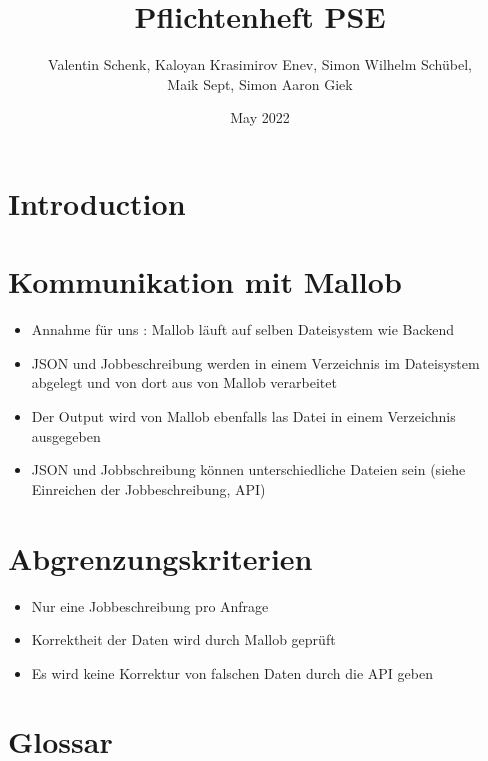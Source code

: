 


\title{Pflichtenheft PSE}
\author{Valentin Schenk, Kaloyan Krasimirov Enev, Simon Wilhelm Schübel,\\ Maik Sept, Simon Aaron Giek}

\date{May 2022}



\maketitle

\section{Introduction}













\section{Kommunikation mit Mallob}

\begin{itemize}
    \item Annahme für uns : Mallob läuft auf selben Dateisystem wie Backend 
    \item JSON und Jobbeschreibung werden in einem Verzeichnis im Dateisystem abgelegt und von dort aus von Mallob verarbeitet
    \item Der Output wird von Mallob ebenfalls las Datei in einem Verzeichnis ausgegeben
    \item JSON und Jobbschreibung können unterschiedliche Dateien sein (siehe Einreichen der Jobbeschreibung, API)
\end{itemize}



\section{Abgrenzungskriterien}
    \begin{itemize}
        \item Nur eine Jobbeschreibung pro Anfrage
        \item Korrektheit der Daten wird durch Mallob geprüft
        \item Es wird keine Korrektur von falschen Daten durch die API geben
    \end{itemize}










\section{Glossar}

